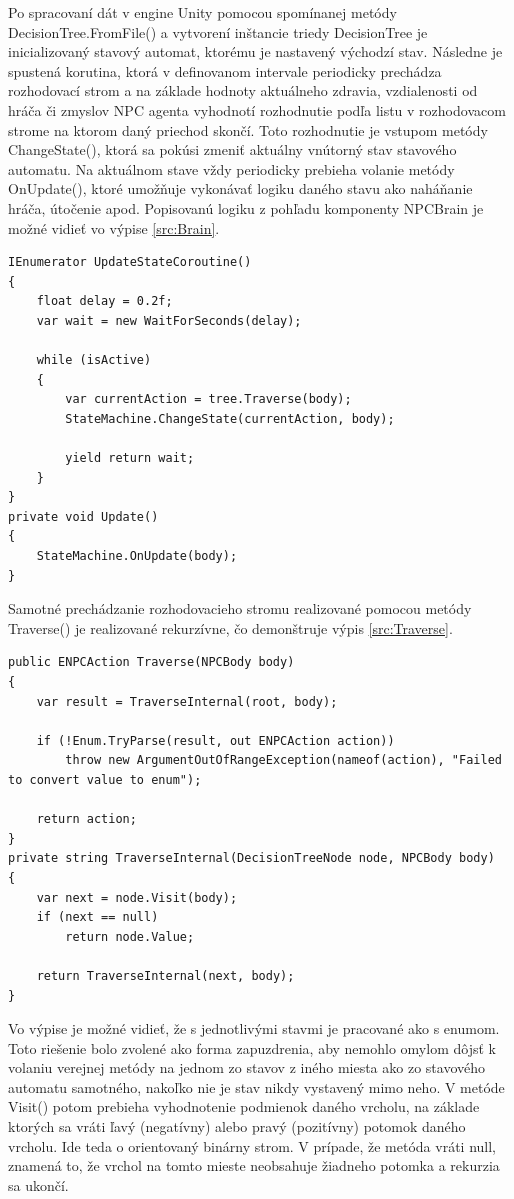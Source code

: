 \documentclass[slovak, master]{diploma}
\begin{document}
Po spracovaní dát v engine Unity pomocou spomínanej metódy DecisionTree.FromFile() a vytvorení inštancie triedy DecisionTree je inicializovaný stavový automat, ktorému je nastavený východzí stav. Následne je spustená korutina, ktorá v definovanom intervale periodicky prechádza rozhodovací strom a na základe hodnoty aktuálneho zdravia, vzdialenosti od hráča či zmyslov NPC agenta vyhodnotí rozhodnutie podľa listu v rozhodovacom strome na ktorom daný priechod skončí. Toto rozhodnutie je vstupom metódy ChangeState(), ktorá sa pokúsi zmeniť aktuálny vnútorný stav stavového automatu. Na aktuálnom stave vždy periodicky prebieha volanie metódy OnUpdate(), ktoré umožňuje vykonávať logiku daného stavu ako naháňanie hráča, útočenie apod. Popisovanú logiku z pohľadu komponenty NPCBrain je možné vidieť vo výpise \ref{src:Brain}.

\vspace{8pt}
\begin{lstlisting}[label=src:Brain,caption={Aktualizácia stavu NPC agenta}]
IEnumerator UpdateStateCoroutine()
{
    float delay = 0.2f;
    var wait = new WaitForSeconds(delay);

    while (isActive)
    {
        var currentAction = tree.Traverse(body);
        StateMachine.ChangeState(currentAction, body);

        yield return wait;
    }
}
private void Update()
{
    StateMachine.OnUpdate(body);
}
\end{lstlisting}

Samotné prechádzanie rozhodovacieho stromu realizované pomocou metódy Traverse() je realizované rekurzívne, čo demonštruje výpis \ref{src:Traverse}.

\vspace{8pt}
\begin{lstlisting}[label=src:Traverse,caption={Prechádzanie rozhodovacím stromom}]
public ENPCAction Traverse(NPCBody body)
{
    var result = TraverseInternal(root, body);
    
    if (!Enum.TryParse(result, out ENPCAction action))
        throw new ArgumentOutOfRangeException(nameof(action), "Failed to convert value to enum");

    return action;
}
private string TraverseInternal(DecisionTreeNode node, NPCBody body)
{
    var next = node.Visit(body);
    if (next == null)
        return node.Value;

    return TraverseInternal(next, body);
}
\end{lstlisting}

Vo výpise je možné vidieť, že s jednotlivými stavmi je pracované ako s enumom. Toto riešenie bolo zvolené ako forma zapuzdrenia, aby nemohlo omylom dôjsť k volaniu verejnej metódy na jednom zo stavov z iného miesta ako zo stavového automatu samotného, nakoľko nie je stav nikdy vystavený mimo neho. V metóde Visit() potom prebieha vyhodnotenie podmienok daného vrcholu, na základe ktorých sa vráti ľavý (negatívny) alebo pravý (pozitívny) potomok daného vrcholu. Ide teda o orientovaný binárny strom. V prípade, že metóda vráti null, znamená to, že vrchol na tomto mieste neobsahuje žiadneho potomka a rekurzia sa ukončí.
\end{document}
